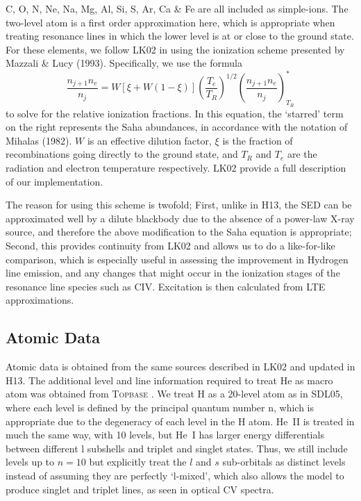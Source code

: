 \documentclass[preprint, a4paper, 11pt]{aastex}
\begin{document}
C, O, N, Ne, Na, Mg, Al, Si, S, Ar, Ca \& Fe are all included as simple-ions. 
The two-level atom is a first order approximation here, which is appropriate 
when treating resonance lines in which the lower level is at or close to the 
ground state. 
For these elements, we follow LK02 in using the ionization scheme presented by Mazzali \& Lucy (1993). 
Specifically, we use the formula
\begin{equation}
\frac{n_{j+1} n_e}{n_j} = W [\xi + W(1-\xi)]
\left(\frac{T_e}{T_R}\right)^{1/2}
\left(\frac{n_{j+1}n_e}{n_j}\right)^*_{T_R} \label{ionization}
\end{equation}
to solve for the relative ionization fractions. In this equation, the `starred' term on 
the right represents the Saha abundances, in accordance with the notation of Mihalas (1982). 
$W$ is an effective dilution factor, $\xi$ is the
fraction of recombinations going directly to the ground state, and
$T_R$ and $T_e$ are the radiation and electron temperature
respectively. LK02 provide a full description of our implementation.

The reason for using this scheme 
is twofold; First, unlike in H13, the SED can be approximated well by a dilute blackbody due to the 
absence of a power-law X-ray source, and therefore the above modification to the Saha equation
is appropriate; Second, this provides continuity from LK02 and allows us to do a like-for-like comparison,
which is especially useful in assessing the improvement in Hydrogen line emission, and any changes
that might occur in the ionization stages of the resonance line species such as CIV. 
Excitation is then calculated from LTE approximations. 



\subsection{Atomic Data}
Atomic data is obtained from the same sources described in LK02 and updated in H13. 
The additional level and line information required to treat He as macro atom was 
obtained from \textsc{Topbase} \citep{topbase2005}. We treat H as a 20-level atom as in SDL05, where 
each level is defined by the principal quantum number n, which is appropriate due to
the degeneracy of each level in the H atom. He~\textsc{II} is treated in much the same way,
with 10 levels, but He~\textsc{I} has larger energy differentials between different l subshells
and triplet and singlet states. Thus, we still include levels up to $n=10$ but explicitly 
treat the $l$ and $s$ sub-orbitals as distinct levels instead of assuming they are perfectly `l-mixed',
which also allows the model to produce singlet and 
triplet lines, as seen in optical CV spectra.
\end{document}
